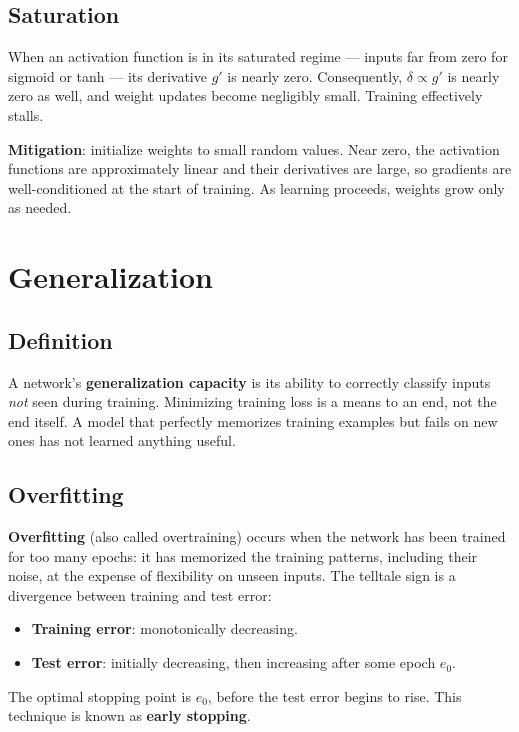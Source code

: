 \documentclass[11pt,a4paper]{article}
\theoremstyle{definition}
\theoremstyle{plain}
\theoremstyle{remark}
\begin{document}
\subsection{Saturation}

When an activation function is in its saturated regime --- inputs far from zero for sigmoid or tanh --- its derivative $g'$ is nearly zero. Consequently, $\delta \propto g'$ is nearly zero as well, and weight updates become negligibly small. Training effectively stalls.

\textbf{Mitigation}: initialize weights to small random values. Near zero, the activation functions are approximately linear and their derivatives are large, so gradients are well-conditioned at the start of training. As learning proceeds, weights grow only as needed.


\section{Generalization}

\subsection{Definition}

A network's \textbf{generalization capacity} is its ability to correctly classify inputs \emph{not} seen during training. Minimizing training loss is a means to an end, not the end itself. A model that perfectly memorizes training examples but fails on new ones has not learned anything useful.

\subsection{Overfitting}

\textbf{Overfitting} (also called overtraining) occurs when the network has been trained for too many epochs: it has memorized the training patterns, including their noise, at the expense of flexibility on unseen inputs. The telltale sign is a divergence between training and test error:

\begin{itemize}
    \item \textbf{Training error}: monotonically decreasing.
    \item \textbf{Test error}: initially decreasing, then increasing after some epoch $e_0$.
\end{itemize}

The optimal stopping point is $e_0$, before the test error begins to rise. This technique is known as \textbf{early stopping}.
\end{document}
